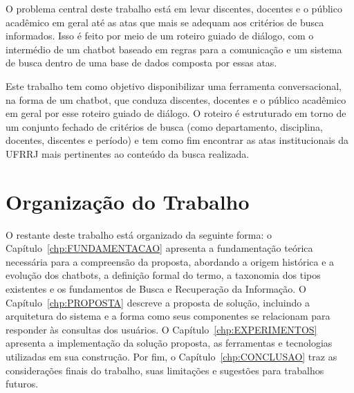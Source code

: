O problema central deste trabalho está em levar discentes, docentes e o público acadêmico em geral até as atas que mais se adequam aos critérios de busca informados. Isso é feito por meio de um roteiro guiado de diálogo, com o intermédio de um chatbot baseado em regras para a comunicação e um sistema de busca dentro de uma base de dados composta por essas atas.

Este trabalho tem como objetivo disponibilizar uma ferramenta conversacional, na forma de um chatbot, que conduza discentes, docentes e o público acadêmico em geral por esse roteiro guiado de diálogo. O roteiro é estruturado em torno de um conjunto fechado de critérios de busca (como departamento, disciplina, docentes, discentes e período) e tem como fim encontrar as atas institucionais da UFRRJ mais pertinentes ao conteúdo da busca realizada.


\section{Organização do Trabalho}

O restante deste trabalho está organizado da seguinte forma: o Capítulo~\ref{chp:FUNDAMENTACAO} apresenta a fundamentação teórica necessária para a compreensão da proposta, abordando a origem histórica e a evolução dos chatbots, a definição formal do termo, a taxonomia dos tipos existentes e os fundamentos de Busca e Recuperação da Informação. O Capítulo~\ref{chp:PROPOSTA} descreve a proposta de solução, incluindo a arquitetura do sistema e a forma como seus componentes se relacionam para responder às consultas dos usuários. O Capítulo~\ref{chp:EXPERIMENTOS} apresenta a implementação da solução proposta, as ferramentas e tecnologias utilizadas em sua construção. Por fim, o Capítulo~\ref{chp:CONCLUSAO} traz as considerações finais do trabalho, suas limitações e sugestões para trabalhos futuros.
